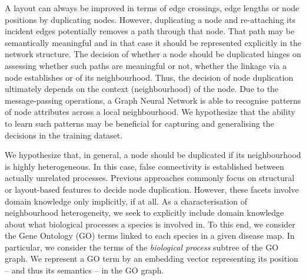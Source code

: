 \documentclass[
	fontsize=10pt, %
	twoside=false, %
	secnumdepth=1, %
  toc=indentunnumbered %
]{kaobook}
\begin{document}
A layout can always be improved in terms of edge crossings, edge lengths or node
positions by duplicating nodes. However, duplicating a node and re-attaching its
incident edges potentially removes a path through that node. That path
may be semantically meaningful and in that case it should be represented
explicitly in the network structure.
The decision of whether a node should be duplicated hinges on
assessing whether such paths are meaningful or not, \ie whether the linkage via
a node establishes  or  of its neighbourhood.
Thus, the decision of node duplication ultimately depends on the context
(neighbourhood) of the node.
%
Due to the message-passing operations, a Graph Neural
Network is able to recognise patterns of node attributes across a local
neighbourhood. We hypothesize that the ability to learn such patterns may be
beneficial for capturing and generalising the decisions in the training dataset.



We hypothesize that, in general, a node should be duplicated if its
neighbourhood is highly heterogeneous. In this case, false connectivity is
established between actually unrelated processes.
Previous approaches commonly focus on structural or layout-based features to
decide node duplication.
However, these facets involve domain knowledge only implicitly, if at all.
As a characterisation of neighbourhood heterogeneity, we seek
to explicitly include domain knowledge about what biological processes a species
is involved in. To this end, we consider the Gene Ontology (GO) terms linked to each
species in a given disease map. In particular, we consider the terms of the
\textit{biological process} subtree of the GO graph.
%
We represent a GO term by an embedding vector representing its position -- and
thus its semantics -- in the GO graph.
\end{document}
